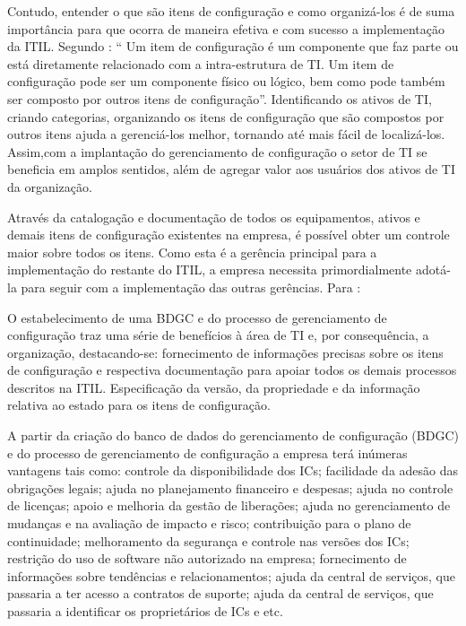 \documentclass[eso]{bcc}
\begin{document}
Contudo, entender o que são itens de configuração e como organizá-los é de suma importância para que ocorra de maneira efetiva e com sucesso a implementação da ITIL. Segundo \cite[p. 69]{magalhaes:2007}: “ Um item de configuração é um componente que faz parte ou está diretamente relacionado com a intra-estrutura de TI. Um item de configuração pode ser um componente físico ou lógico, bem como pode também ser composto por outros itens de configuração”. Identificando os ativos de TI, criando categorias, organizando os itens de configuração que são compostos por outros itens ajuda a gerenciá-los melhor, tornando até mais fácil de localizá-los. Assim,com a implantação do gerenciamento de configuração o setor de TI  se beneficia em amplos sentidos, além de agregar valor aos usuários dos ativos de TI da organização. 

Através da catalogação e documentação de todos os equipamentos, ativos e demais itens de configuração existentes na empresa, é possível obter um controle maior sobre todos os itens. Como esta é a gerência principal para a implementação do restante do ITIL, a empresa necessita primordialmente adotá-la para seguir com a implementação das outras gerências. Para \cite[p. 88]{magalhaes:2007}:
\begin{quoting}
{\footnotesize
 O estabelecimento de uma BDGC e do processo de gerenciamento de configuração traz uma série de benefícios à área de TI e, por consequência, a organização, destacando-se: fornecimento de informações precisas sobre os itens de configuração e respectiva documentação para apoiar todos os demais processos descritos na ITIL. Especificação da versão, da propriedade e da informação relativa ao estado para os itens de configuração.
}
\end{quoting}

A partir da criação do banco de dados do gerenciamento de configuração (BDGC) e do processo de gerenciamento de configuração a empresa terá inúmeras vantagens tais como: controle da disponibilidade dos ICs; facilidade da adesão das obrigações legais; ajuda no planejamento financeiro e despesas; ajuda no controle de licenças; apoio e melhoria da gestão de liberações; ajuda no gerenciamento de mudanças e na avaliação de impacto e risco; contribuição para o plano de continuidade; melhoramento da segurança e controle nas versões dos ICs; restrição do uso de software não autorizado na empresa; fornecimento de informações sobre tendências e relacionamentos; ajuda da central de serviços, que passaria a ter acesso a contratos de suporte; ajuda da central de serviços, que passaria a identificar os proprietários de ICs e etc.
\end{document}
